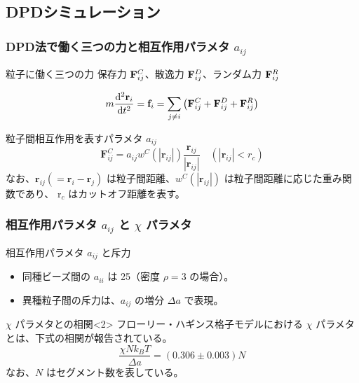 \documentclass[12pt, dvipdfmx]{beamer}
\begin{document}
\subsection{DPDシミュレーション}
\begin{frame}
\frametitle{DPD法で働く三つの力と相互作用パラメタ $a_{ij}$}

	\begin{block}{粒子に働く三つの力}
	保存力 ${\bf F}_{ij}^C$、散逸力 ${\bf F}_{ij}^D$、ランダム力 ${\bf F}_{ij}^R$
	
	\begin{equation*}
	m\dfrac{{\rm d}^2 {\bf r}_i}{{\rm d} t^2} = {\bf f}_i = \sum_{j \neq i} \left( {\bf F}_{ij}^C + {\bf F}_{ij}^D + {\bf F}_{ij}^R \right)
	\end{equation*}
	\end{block}

	\begin{block}{粒子間相互作用を表すパラメタ $a_{ij}$} %
	\begin{equation*}
	\mathbf{F}_{ij}^C =
	        	a_{ij} w^C (|\mathbf{r}_{ij}|) \dfrac{\mathbf{r}_{ij}}{|\mathbf{r}_{ij}|} \quad (|\mathbf{r}_{ij}| < r_c)
	\end{equation*}
	なお、$\mathbf{r}_{ij} (=\mathbf{r}_i - \mathbf{r}_j)$ は粒子間距離、$w^C (|\mathbf{r}_{ij}|)$ は粒子間距離に応じた重み関数であり、 r$_c$ はカットオフ距離を表す。
	\end{block}
\end{frame}

\begin{frame}
\frametitle{相互作用パラメタ $a_{ij}$ と $\chi$ パラメタ}

\begin{block}{相互作用パラメタ $a_{ij}$ と斥力}
	\begin{itemize}
	\item
	同種ビーズ間の $a_{ii}$ は 25（密度 $\rho =3$ の場合）。
	\item
	異種粒子間の斥力は、$a_{ij}$ の増分 $\Delta a$ で表現。
	\end{itemize}
\end{block}
\begin{exampleblock}{$\chi$ パラメタとの相関}<2>
	フローリー・ハギンス格子モデルにおける $\chi$ パラメタとは、下式の相関が報告されている。
	\begin{equation*}
	\dfrac{\chi N k_B T}{\Delta a} = (0.306 \pm 0.003) N
	\label{eq:achi}
	\end{equation*}
	なお、$N$ はセグメント数を表している。
\end{exampleblock}
\end{frame}
\end{document}

